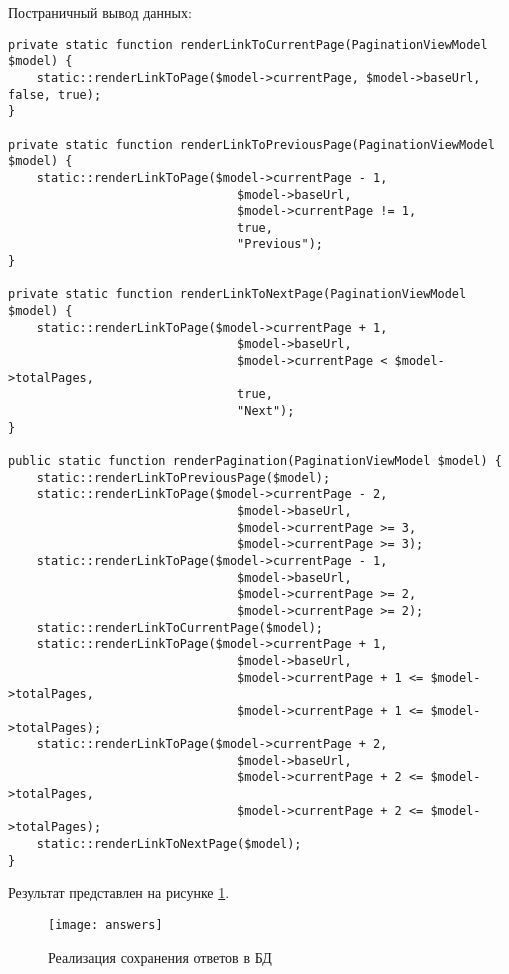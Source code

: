 \documentclass[a4paper,14pt]{extarticle}
\begin{document}
Постраничный вывод данных:
\begin{lstlisting}
private static function renderLinkToCurrentPage(PaginationViewModel $model) {
    static::renderLinkToPage($model->currentPage, $model->baseUrl, false, true);
}

private static function renderLinkToPreviousPage(PaginationViewModel $model) {
    static::renderLinkToPage($model->currentPage - 1,
                                $model->baseUrl,
                                $model->currentPage != 1,
                                true,
                                "Previous");
}

private static function renderLinkToNextPage(PaginationViewModel $model) {
    static::renderLinkToPage($model->currentPage + 1,
                                $model->baseUrl,
                                $model->currentPage < $model->totalPages,
                                true,
                                "Next");
}

public static function renderPagination(PaginationViewModel $model) {
    static::renderLinkToPreviousPage($model);
    static::renderLinkToPage($model->currentPage - 2,
                                $model->baseUrl,
                                $model->currentPage >= 3,
                                $model->currentPage >= 3);
    static::renderLinkToPage($model->currentPage - 1,
                                $model->baseUrl,
                                $model->currentPage >= 2,
                                $model->currentPage >= 2);
    static::renderLinkToCurrentPage($model);
    static::renderLinkToPage($model->currentPage + 1,
                                $model->baseUrl,
                                $model->currentPage + 1 <= $model->totalPages,
                                $model->currentPage + 1 <= $model->totalPages);
    static::renderLinkToPage($model->currentPage + 2,
                                $model->baseUrl,
                                $model->currentPage + 2 <= $model->totalPages,
                                $model->currentPage + 2 <= $model->totalPages);
    static::renderLinkToNextPage($model);
}
\end{lstlisting}

Результат представлен на рисунке \ref{fig:answers}.
\begin{figure}[H]
    \centering
    \texttt{[image: answers]}
    \caption{Реализация сохранения ответов в БД}
    \label{fig:answers}
\end{figure}
\end{document}
